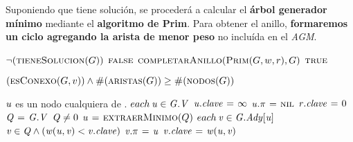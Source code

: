 Suponiendo que tiene solución, se procederá a calcular el \textbf{árbol
generador mínimo} mediante el \textbf{algoritmo de Prim}. Para obtener el
anillo, \textbf{formaremos un ciclo agregando la arista de menor peso} no
incluída en el \textit{AGM}.


\begin{codebox}
\li \If $\neg (\textnormal{\scshape tieneSolucion}(G))$
\li     \Then
            \Return $\textnormal{\scshape false}$
        \End
\li $\textnormal{\scshape completarAnillo}(\textnormal{\scshape Prim}(G,w,r),G)$
\li \Return $\textnormal{\scshape true}$
\end{codebox}


\vspace*{0.3cm}


\begin{codebox}
\li \Return $(\textnormal{\scshape esConexo}(G,v)) \land
    \textnormal{\scshape\#}(\textnormal{\scshape aristas}(G)) \geq
    \textnormal{\scshape\#}(\textnormal{\scshape nodos}(G))$
\end{codebox}


\vspace*{0.3cm}


\begin{codebox}
\li \Comment $\id{u}$ es un nodo cualquiera de .
\li \For $each \hspace{0.07cm} \id{u} \in \id{G.V}$
\li     \Do
            $\id{u.clave} \gets \infty$
\li         $\id{u.\pi} \gets \const{nil}$
        \End
\li $\id{r.clave} \gets 0$
\li $\id{Q} \gets \id{G.V}$
\li \While $\id{Q} \neq 0$
\li     \Do
            $\id{u} \gets \proc{extraerMinimo}(Q)$
\li         \For $each \hspace{0.07cm} \id{v} \in \id{G.Ady[u]}$
                \Do
\li                 \If $\id{v} \in \id{Q} \land (\id{w(u,v)} < \id{v.clave})$
\li                     \Then
                            $\id{v.\pi} \gets \id{u}$
\li                         $\id{v.clave} \gets \id{w(u,v)}$
                        \End
                \End
        \End
\end{codebox}


\vspace*{0.3cm}



